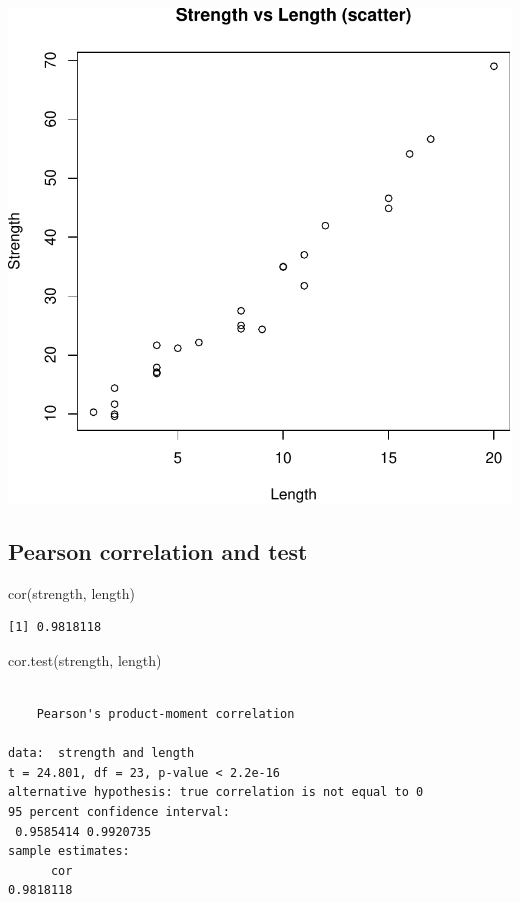 \documentclass[
  letterpaper,
]{scrbook}
\newenvironment{Shaded}{\begin{snugshade}}{\end{snugshade}}
\newcommand{\FunctionTok}[1]{\textcolor[rgb]{0.28,0.35,0.67}{#1}}
\newcommand{\NormalTok}[1]{\textcolor[rgb]{0.00,0.23,0.31}{#1}}
\begin{document}
\includegraphics{unit2-slr/slr_files/figure-pdf/correlation-data-1.pdf}

\subsection{Pearson correlation and
test}\label{pearson-correlation-and-test}

\begin{Shaded}
\begin{Highlighting}[]
\FunctionTok{cor}\NormalTok{(strength, length)}
\end{Highlighting}
\end{Shaded}

\begin{verbatim}
[1] 0.9818118
\end{verbatim}

\begin{Shaded}
\begin{Highlighting}[]
\FunctionTok{cor.test}\NormalTok{(strength, length)}
\end{Highlighting}
\end{Shaded}

\begin{verbatim}

    Pearson's product-moment correlation

data:  strength and length
t = 24.801, df = 23, p-value < 2.2e-16
alternative hypothesis: true correlation is not equal to 0
95 percent confidence interval:
 0.9585414 0.9920735
sample estimates:
      cor 
0.9818118 
\end{verbatim}
\end{document}
